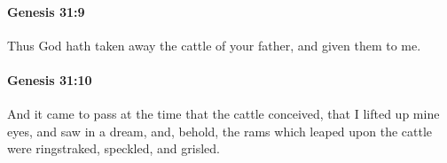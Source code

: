 		\paragraph{Genesis 31:9} %
			\label{GENESIS-31-9}

			Thus God hath taken away the cattle of your father, and given them to me.


		\paragraph{Genesis 31:10} %
			\label{GENESIS-31-10}

			And it came to pass at the time that the cattle conceived, that I lifted up mine eyes, and saw in a dream, and, behold, the rams which leaped upon the cattle were ringstraked, speckled, and grisled.


